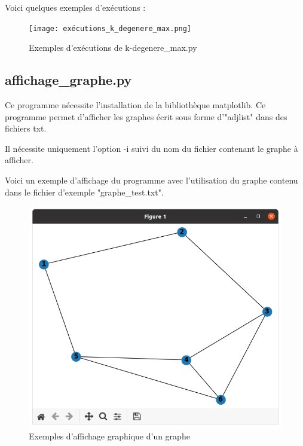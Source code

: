 \documentclass[a4paper, 11pt, oneside]{article}
\begin{document}
Voici quelques exemples d'exécutions :
\begin{figure}[h]
    \centering
    \texttt{[image: exécutions\_k\_degenere\_max.png]}
    \caption{Exemples d'exécutions de k-degenere\_max.py}
\end{figure}

\subsection{affichage\_graphe.py}
Ce programme nécessite l'installation de la bibliothèque matplotlib.
Ce programme permet d'afficher les graphes écrit sous forme d'"adjlist" dans des 
fichiers txt.

Il nécessite uniquement l'option -i suivi du nom du fichier contenant le 
graphe à afficher.

Voici un exemple d'affichage du programme avec l'utilisation du graphe contenu dans 
le fichier d'exemple "graphe\_test.txt".

\begin{figure}[h]
    \centering
    \includegraphics[scale=0.38]{affichage_graphe.png}
    \caption{Exemples d'affichage graphique d'un graphe}
\end{figure}
\end{document}
